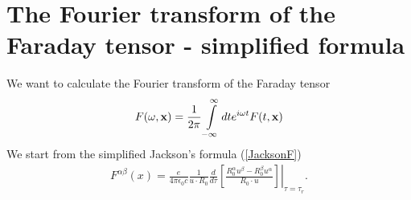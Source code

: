 

\section{The Fourier transform of the Faraday tensor - simplified formula}\label{sect:FTF-simplified}

We want to calculate the Fourier transform of the Faraday tensor
\begin{align}
  F(\omega, {\bf x}) = \frac1{2\pi}\int\limits_{-\infty}^{\infty} dt e^{i\omega t}F(t,{\bf x})
\end{align}
We start from the simplified Jackson's formula (\ref{JacksonF})
\begin{align}
  F^{\alpha\beta}(x) =\left.\frac{e}{4\pi\epsilon_0c}\frac1{u\cdot R_0} \frac{d}{d\tau}\left[ \frac{R_0^{\alpha}u^{\beta}-R_0^{\beta}u^{\alpha}}{R_0\cdot u}\right]\right|_{\tau=\tau_r}.
\end{align}

